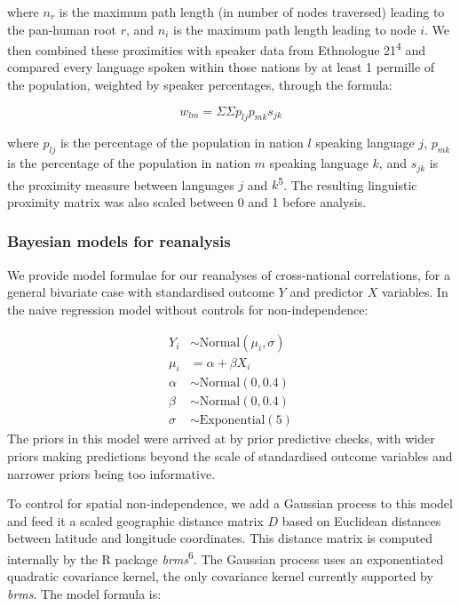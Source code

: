 \begin{appendix}
where \(n_{r}\) is the maximum path length (in number of nodes
traversed) leading to the pan-human root \(r\), and \(n_{i}\) is the
maximum path length leading to node \(i\). We then combined these
proximities with speaker data from Ethnologue 21\textsuperscript{4} and
compared every language spoken within those nations by at least 1
permille of the population, weighted by speaker percentages, through the
formula:

\[
w_{lm} = {\Sigma}{\Sigma}p_{lj}p_{mk}s_{jk}
\]

where \(p_{lj}\) is the percentage of the population in nation \(l\)
speaking language \(j\), \(p_{mk}\) is the percentage of the population
in nation \(m\) speaking language \(k\), and \(s_{jk}\) is the proximity
measure between languages \(j\) and \(k\)\textsuperscript{5}. The
resulting linguistic proximity matrix was also scaled between 0 and 1
before analysis.

\hypertarget{bayesian-models-for-reanalysis}{%
\subsubsection{Bayesian models for
reanalysis}\label{bayesian-models-for-reanalysis}}

We provide model formulae for our reanalyses of cross-national
correlations, for a general bivariate case with standardised outcome
\(Y\) and predictor \(X\) variables. In the naive regression model
without controls for non-independence:

\[
\begin{aligned}
Y_{i} &\sim \text{Normal}(\mu_{i},\sigma) \\
\mu_{i} &= \alpha + \beta X_{i} \\
\alpha &\sim \text{Normal}(0, 0.4) \\
\beta &\sim \text{Normal}(0, 0.4) \\
\sigma &\sim \text{Exponential}(5)
\end{aligned}
\] The priors in this model were arrived at by prior predictive checks,
with wider priors making predictions beyond the scale of standardised
outcome variables and narrower priors being too informative.

\newpage

To control for spatial non-independence, we add a Gaussian process to
this model and feed it a scaled geographic distance matrix \(D\) based
on Euclidean distances between latitude and longitude coordinates. This
distance matrix is computed internally by the R package
\emph{brms}\textsuperscript{6}. The Gaussian process uses an
exponentiated quadratic covariance kernel, the only covariance kernel
currently supported by \emph{brms}. The model formula is:


\end{appendix}

